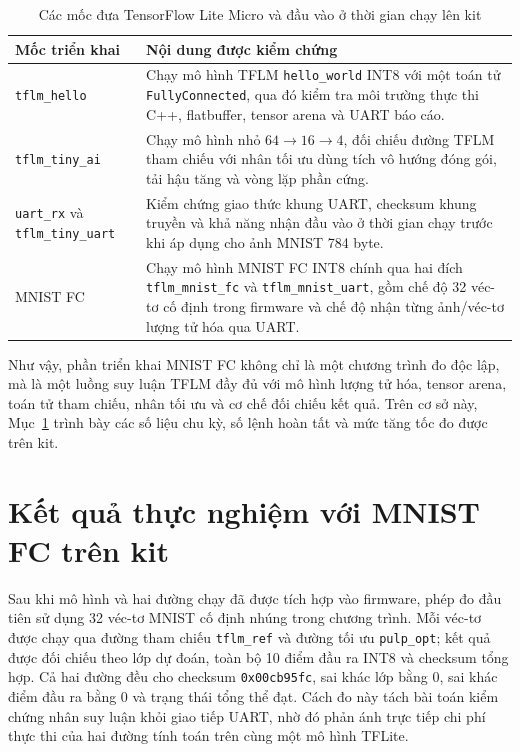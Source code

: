 \documentclass[../DoAn.tex]{subfiles}
\begin{document}
\begin{table}[H]
    \centering
    \footnotesize
    \renewcommand{\arraystretch}{1.13}
    \begin{tabular}{|>{\raggedright\arraybackslash}p{3.20cm}|>{\raggedright\arraybackslash}p{9.40cm}|}
        \hline
        \textbf{Mốc triển khai} & \textbf{Nội dung được kiểm chứng} \\
        \hline
        \texttt{tflm\_hello} & Chạy mô hình TFLM \texttt{hello\_world} INT8 với một toán tử \texttt{FullyConnected}, qua đó kiểm tra môi trường thực thi C++, flatbuffer, tensor arena và UART báo cáo. \\
        \hline
        \texttt{tflm\_tiny\_ai} & Chạy mô hình nhỏ \(64 \rightarrow 16 \rightarrow 4\), đối chiếu đường TFLM tham chiếu với nhân tối ưu dùng tích vô hướng đóng gói, tải hậu tăng và vòng lặp phần cứng. \\
        \hline
        \texttt{uart\_rx} và \texttt{tflm\_tiny\_uart} & Kiểm chứng giao thức khung UART, checksum khung truyền và khả năng nhận đầu vào ở thời gian chạy trước khi áp dụng cho ảnh MNIST 784 byte. \\
        \hline
        MNIST FC & Chạy mô hình MNIST FC INT8 chính qua hai đích \texttt{tflm\_mnist\_fc} và \texttt{tflm\_mnist\_uart}, gồm chế độ 32 véc-tơ cố định trong firmware và chế độ nhận từng ảnh/véc-tơ lượng tử hóa qua UART. \\
        \hline
    \end{tabular}
    \caption{Các mốc đưa TensorFlow Lite Micro và đầu vào ở thời gian chạy lên kit}
    \label{tab:tflm-bring-up}
\end{table}

Như vậy, phần triển khai MNIST FC không chỉ là một chương trình đo độc lập, mà là một luồng suy luận TFLM đầy đủ với mô hình lượng tử hóa, tensor arena, toán tử tham chiếu, nhân tối ưu và cơ chế đối chiếu kết quả. Trên cơ sở này, Mục~\ref{sec:ket-qua-mnist-fc-board} trình bày các số liệu chu kỳ, số lệnh hoàn tất và mức tăng tốc đo được trên kit.

\section{Kết quả thực nghiệm với MNIST FC trên kit}
\label{sec:ket-qua-mnist-fc-board}

Sau khi mô hình và hai đường chạy đã được tích hợp vào firmware, phép đo đầu tiên sử dụng 32 véc-tơ MNIST cố định nhúng trong chương trình. Mỗi véc-tơ được chạy qua đường tham chiếu \texttt{tflm\_ref} và đường tối ưu \texttt{pulp\_opt}; kết quả được đối chiếu theo lớp dự đoán, toàn bộ 10 điểm đầu ra INT8 và checksum tổng hợp. Cả hai đường đều cho checksum \texttt{0x00cb95fc}, sai khác lớp bằng 0, sai khác điểm đầu ra bằng 0 và trạng thái tổng thể đạt. Cách đo này tách bài toán kiểm chứng nhân suy luận khỏi giao tiếp UART, nhờ đó phản ánh trực tiếp chi phí thực thi của hai đường tính toán trên cùng một mô hình TFLite.
\end{document}
